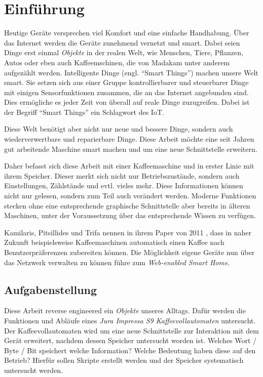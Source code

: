 \chapter{Einführung}
Heutige Geräte versprechen viel Komfort und eine einfache Handhabung. Über das Internet werden die Geräte zunehmend vernetzt und smart.
Dabei seien Dinge erst einmal \textit{Objekte} in der realen Welt, wie Menschen, Tiere, Pflanzen, Autos oder eben auch Kaffeemschinen, die von Madakam \cite{Madakam2015} unter anderem aufgezählt werden.
Intelligente Dinge (engl. "`Smart Things"') machen unsere Welt smart.
Sie setzen sich aus einer Gruppe kontrollierbarer und steuerbarer Dinge mit einigen Sensorfunktionen zusammen, die an das Internet angebunden sind.
Dies ermögliche es jeder Zeit von überall auf reale Dinge zuzugreifen.
Dabei ist der Begriff "`Smart Things"' ein Schlagwort des \ac{IoT}. \cite{Madakam2015}

Diese Welt benötigt aber nicht nur neue und bessere Dinge, sondern auch wiederverwertbare und reparierbare Dinge.
Diese Arbeit möchte eine seit Jahren gut arbeitende Maschine smart machen und um eine neue Schnittstelle erweitern.

Daher befasst sich diese Arbeit mit einer Kaffeemaschine und in erster Linie mit ihrem Speicher. Dieser merkt sich nicht nur Betriebszustände,
sondern auch Einstellungen, Zählstände und evtl. vieles mehr. Diese Informationen können nicht nur gelesen, sondern zum Teil auch verändert werden.
Moderne Funktionen stecken ohne eine entsprechende graphische Schnittstelle aber bereits in älteren Maschinen, unter der Voraussetzung über das entsprechende Wissen zu verfügen.

Kamilaris, Pitsillides und Trifa nennen in ihrem Paper von 2011 \cite{Kamilaris2011}, dass in naher Zukunft beispielsweise Kaffeemaschinen automatisch einen Kaffee nach Benutzerpräferenzen zubereiten können.
Die Möglichkeit eigene Geräte nun über das Netzwerk verwalten zu können führe zum \textit{Web-enabled Smart Home}.

\section{Aufgabenstellung}
Diese Arbeit reverse engineered ein \textit{Objekte} unseres Alltags.
Dafür werden die Funktionen und Abläufe eines \textit{Jura Impressa S9 Kaffeevollautomaten} untersucht.
Der Kaffeevollautomaten wird um eine neue Schnittstelle zur Interaktion mit dem Gerät erweitert, nachdem dessen Speicher untersucht worden ist.
Welches Wort / Byte / Bit speichert welche Information? Welche Bedeutung haben diese auf den Betrieb?
Hierfür sollen Skripte erstellt werden und der Speicher systematisch untersucht werden.

